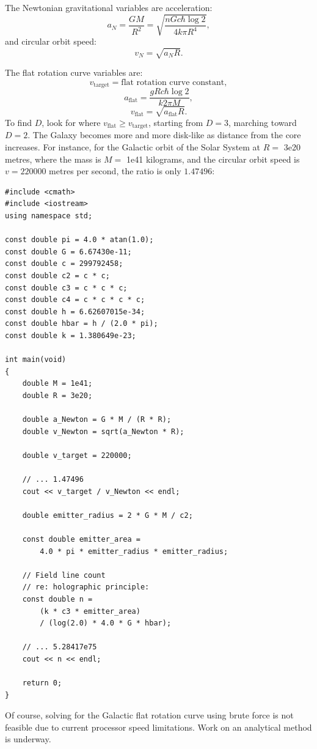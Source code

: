 \documentclass[12pt]{article}
\begin{document}
The Newtonian gravitational variables are acceleration:
\begin{equation}
a_N = \frac{G M}{R^2} = \sqrt{\frac{n G c \hbar \log 2}{4 k \pi R^4}},
\end{equation}
and circular orbit speed:
\begin{equation}
v_N = \sqrt{a_N R}.
\end{equation}

The flat rotation curve variables are:
\begin{equation}
v_{\textrm{target}} = {\textrm {flat rotation curve constant}}, %
\end{equation}
\begin{equation}
a_{\textrm{flat}} = \frac{g R c \hbar \log 2}{k 2 \pi M},
\end{equation}
\begin{equation}
v_{\textrm{flat}} = \sqrt{a_{\textrm{flat}} R}.
\end{equation}
To find $D$, look for where $v_{\textrm{flat}} \geq v_{\textrm{target}}$, starting from $D = 3$, marching toward $D = 2$.
The Galaxy becomes more and more disk-like as distance from the core increases.
For instance, for the Galactic orbit of the Solar System at $R = $ 3e20 metres, where the mass is $M = $ 1e41 kilograms, and the circular orbit speed is $v = 220000$ metres per second, the ratio is only $1.47496$:
\begin{lstlisting}
#include <cmath>
#include <iostream>
using namespace std;

const double pi = 4.0 * atan(1.0);
const double G = 6.67430e-11;
const double c = 299792458;
const double c2 = c * c;
const double c3 = c * c * c;
const double c4 = c * c * c * c;
const double h = 6.62607015e-34;
const double hbar = h / (2.0 * pi);
const double k = 1.380649e-23;

int main(void)
{
	double M = 1e41;
	double R = 3e20;

	double a_Newton = G * M / (R * R);
	double v_Newton = sqrt(a_Newton * R);

	double v_target = 220000;

	// ... 1.47496
	cout << v_target / v_Newton << endl;

	double emitter_radius = 2 * G * M / c2;

	const double emitter_area =
		4.0 * pi * emitter_radius * emitter_radius;

	// Field line count
	// re: holographic principle:
	const double n =
		(k * c3 * emitter_area)
		/ (log(2.0) * 4.0 * G * hbar);

	// ... 5.28417e75
	cout << n << endl;

	return 0;
}
\end{lstlisting}
Of course, solving for the Galactic flat rotation curve using brute force is not feasible due to current processor speed limitations.
Work on an analytical method is underway.
\end{document}
